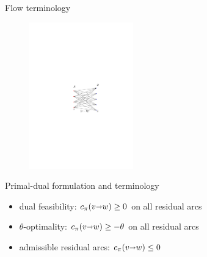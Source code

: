 \documentclass[xcolor={dvipsnames,usenames}]{beamer}
\def\arcto{\mathord\shortrightarrow}
\def\arc#1#2{#1\arcto#2}
\begin{document}
\begin{frame}{Flow terminology}
\begin{figure}
\begin{center}
\includegraphics[width=0.4\textwidth,page=8]{pm-to-mcf}%
\end{center}
\end{figure}
\end{frame}

\begin{frame}{Primal-dual formulation and terminology}
\begin{itemize}
\item dual feasibility: $c_\pi(\arc vw) \geq 0$ on all residual arcs
\item \alert{$\theta$-optimality}: $c_\pi(\arc vw) \geq -\theta$ on all residual arcs
\vspace{5pt}
\item \alert{admissible} residual arcs: $c_\pi(\arc vw) \leq 0$ 
\end{itemize}
\end{frame}
\end{document}
